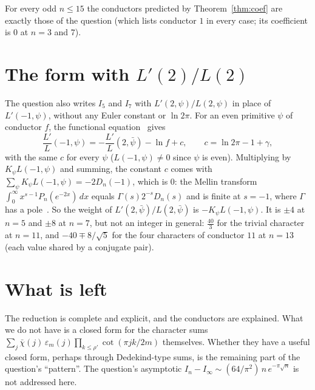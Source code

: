 \documentclass[11pt]{article}
\begin{document}
For every odd $n\le15$ the conductors predicted by Theorem~\ref{thm:coef} are exactly those of the question (which
lists conductor $1$ in every case; its coefficient is $0$ at $n=3$ and $7$).

\section{The form with \texorpdfstring{$L'(2)/L(2)$}{L'(2)/L(2)}}

The question also writes $I_5$ and $I_7$ with $L'(2,\psi)/L(2,\psi)$ in place of $L'(-1,\psi)$, without any Euler
constant or $\ln2\pi$. For an even primitive $\psi$ of conductor $f$, the functional equation~\cite[Corollary~10.9]{MV}
gives
\[
\frac{L'}{L}(-1,\psi)=-\frac{L'}{L}(2,\bar\psi)-\ln f+c,\qquad c=\ln2\pi-1+\gamma,
\]
with the same $c$ for every $\psi$ ($L(-1,\psi)\ne0$ since $\psi$ is even). Multiplying by $K_\psi L(-1,\psi)$ and
summing, the constant $c$ comes with $\sum_\psi K_\psi L(-1,\psi)=-2D_n(-1)$, which is $0$: the Mellin transform
$\int_0^\infty x^{s-1}P_n(e^{-2x})\,dx$ equals $\Gamma(s)2^{-s}D_n(s)$ and is finite at $s=-1$, where $\Gamma$ has a
pole~\cite{MSE}. So the weight of
$L'(2,\bar\psi)/L(2,\bar\psi)$ is $-K_\psi L(-1,\psi)$. It is $\pm4$ at $n=5$ and $\pm8$ at $n=7$, but not an integer
in general: $\tfrac{40}{3}$ for the trivial character at $n=11$, and $-40\mp8/\sqrt5$ for the four characters of
conductor $11$ at $n=13$ (each value shared by a conjugate pair).

\section{What is left}

The reduction is complete and explicit, and the conductors are explained. What we do not have is a closed form for
the character sums $\sum_j\bar\chi(j)\,\varepsilon_m(j)\prod_{k\le\rho'}\cot(\pi jk/2m)$ themselves. Whether they have a
useful closed form, perhaps through Dedekind-type sums, is the remaining part of the question's ``pattern''. The
question's asymptotic $I_n-I_\infty\sim(64/\pi^2)\,n\,e^{-\pi\sqrt n}$ is not addressed here.
\end{document}

